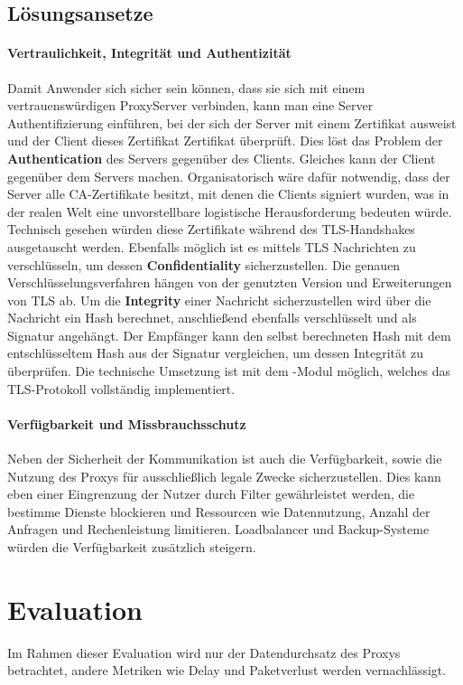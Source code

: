 \documentclass[12pt, a4paper]{scrartcl}
\begin{document}
\subsection{Lösungsansetze}
\paragraph{Vertraulichkeit, Integrität und Authentizität}
Damit Anwender sich sicher sein können, dass sie sich mit einem vertrauenswürdigen ProxyServer verbinden, kann man eine Server Authentifizierung einführen, bei der sich der Server mit einem Zertifikat ausweist und der Client dieses Zertifikat Zertifikat überprüft. Dies löst das Problem der \textbf{Authentication} des Servers gegenüber des Clients. Gleiches kann der Client gegenüber dem Servers machen. Organisatorisch wäre dafür notwendig, dass der Server alle CA-Zertifikate besitzt, mit denen die Clients signiert wurden, was in der realen Welt eine unvorstellbare logistische Herausforderung bedeuten würde.\newline
Technisch gesehen würden diese Zertifikate während des \ac{TLS}-Handshakes ausgetauscht werden. Ebenfalls möglich ist es mittels \ac{TLS} Nachrichten zu verschlüsseln, um dessen \textbf{Confidentiality} sicherzustellen. Die genauen Verschlüsselungsverfahren hängen von der genutzten Version und Erweiterungen von \ac{TLS} ab.\newline
Um die \textbf{Integrity} einer Nachricht sicherzustellen wird über die Nachricht ein Hash berechnet, anschließend ebenfalls verschlüsselt und als Signatur angehängt. Der Empfänger kann den selbst berechneten Hash mit dem entschlüsseltem Hash aus der Signatur vergleichen, um dessen Integrität zu überprüfen.\newline
Die technische Umsetzung ist mit dem -Modul möglich, welches das \ac{TLS}-Protokoll vollständig implementiert.
\paragraph{Verfügbarkeit und Missbrauchsschutz}
Neben der Sicherheit der Kommunikation ist auch die Verfügbarkeit, sowie die Nutzung des Proxys für ausschließlich legale Zwecke sicherzustellen. Dies kann eben einer Eingrenzung der Nutzer durch Filter gewährleistet werden, die bestimme Dienste blockieren und Ressourcen wie Datennutzung, Anzahl der Anfragen und Rechenleistung limitieren. Loadbalancer und Backup-Systeme würden die Verfügbarkeit zusätzlich steigern.

\section{Evaluation}
Im Rahmen dieser Evaluation wird nur der Datendurchsatz des Proxys betrachtet, andere Metriken wie Delay und Paketverlust werden vernachlässigt.
\end{document}
